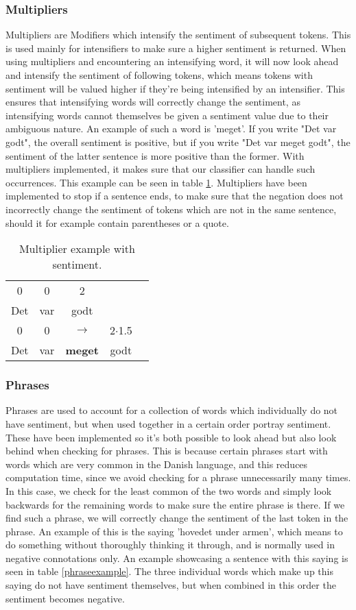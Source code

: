 \subsubsection{Multipliers}
Multipliers are Modifiers which intensify the sentiment of subsequent tokens. This is used mainly for intensifiers to make sure a higher sentiment is returned. When using multipliers and encountering an intensifying word, it will now look ahead and intensify the sentiment of following tokens, which means tokens with sentiment will be valued higher if they're being intensified by an intensifier. This ensures that intensifying words will correctly change the sentiment, as intensifying words cannot themselves be given a sentiment value due to their ambiguous nature. An example of such a word is 'meget'. If you write "Det var godt", the overall sentiment is positive, but if you write "Det var meget godt", the sentiment of the latter sentence is more positive than the former. With multipliers implemented, it makes sure that our classifier can handle such occurrences. This example can be seen in table \ref{multiexample}. Multipliers have been implemented to stop if a sentence ends, to make sure that the negation does not incorrectly change the sentiment of tokens which are not in the same sentence, should it for example contain parentheses or a quote.
\begin{table}[H]
	\begin{tabular}{ccccc} 
		0 & 0 & 2 & & \\ 
		Det & var & godt & & \\ 
		0 & 0 & $\rightarrow$ & 2$\cdot$1.5 & \\ 
		Det & var & \textbf{meget} & godt & 
	\end{tabular}
	\centering
	\caption{Multiplier example with sentiment.}
	\label{multiexample}
\end{table}

\subsubsection{Phrases} \label{phrases}
Phrases are used to account for a collection of words which individually do not have sentiment, but when used together in a certain order portray sentiment. These have been implemented so it's both possible to look ahead but also look behind when checking for phrases. This is because certain phrases start with words which are very common in the Danish language, and this reduces computation time, since we avoid checking for a phrase unnecessarily many times. In this case, we check for the least common of the two words and simply look backwards for the remaining words to make sure the entire phrase is there. If we find such a phrase, we will correctly change the sentiment of the last token in the phrase. An example of this is the saying 'hovedet under armen', which means to do something without thoroughly thinking it through, and is normally used in negative connotations only. An example showcasing a sentence with this saying is seen in table \ref{phraseexample}. The three individual words which make up this saying do not have sentiment themselves, but when combined in this order the sentiment becomes negative. 

